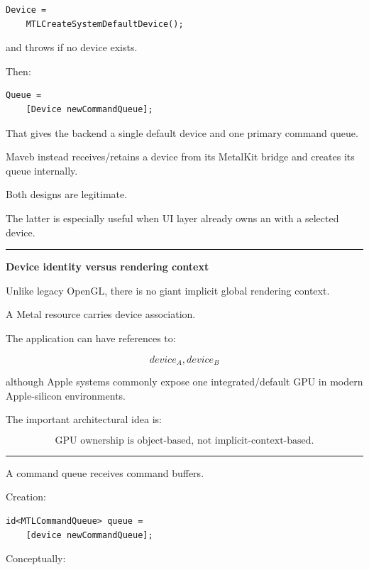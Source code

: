 \begin{verbatim}
Device =
    MTLCreateSystemDefaultDevice();
\end{verbatim}

and throws if no device exists.

Then:

\begin{verbatim}
Queue =
    [Device newCommandQueue];
\end{verbatim}

That gives the backend a single default device and one primary command queue.

Maveb instead receives/retains a device from its MetalKit bridge and creates its queue internally.

Both designs are legitimate.

The latter is especially useful when UI layer already owns an  with a selected device.

\begin{center}\rule{0.5\linewidth}{0.5pt}\end{center}

\textbf{Device identity versus rendering context}

Unlike legacy OpenGL, there is no giant implicit global rendering context.

A Metal resource carries device association.

The application can have references to:

\[
device_A,
device_B
\]

although Apple systems commonly expose one integrated/default GPU in modern Apple-silicon environments.

The important architectural idea is:

\[
\boxed{
\text{GPU ownership is object-based, not implicit-context-based}.
}
\]

\begin{center}\rule{0.5\linewidth}{0.5pt}\end{center}

\textbf{}

A command queue receives command buffers.

Creation:

\begin{verbatim}
id<MTLCommandQueue> queue =
    [device newCommandQueue];
\end{verbatim}

Conceptually:

